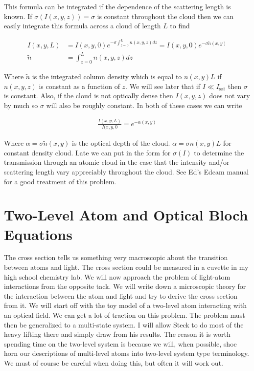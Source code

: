 \documentclass[12pt]{article}
\begin{document}
This formula can be integrated if the dependence of the scattering length is known. If $\sigma(I(x,y,z)) = \sigma$ is constant throughout the cloud then we can easily integrate this formula across a cloud of length $L$ to find

\begin{align}
I(x,y,L) &= I(x,y,0)e^{-\sigma\int_{z=0}^L n(x,y,z) dz} = I(x,y,0) e^{-\sigma \tilde{n}(x,y)}\\
\tilde{n} &= \int_{z=0}^L n(x,y,z) dz
\end{align}

Where $\tilde{n}$ is the integrated column density which is equal to $n(x,y) L$ if $n(x,y,z)$ is constant as a function of $z$. We will see later that if $I \ll I_{\text{sat}}$ then $\sigma$ is constant. Also, if the cloud is not optically dense then $I(x,y,z)$ does not vary by much so $\sigma$ will also be roughly constant. In both of these cases we can write

\begin{align}
\frac{I(x,y,L)}{I(x,y,0} = e^{-\alpha(x,y)}
\end{align}

Where $\alpha = \sigma \tilde{n}(x,y)$ is the optical depth of the cloud. $\alpha = \sigma n(x,y) L$ for constant density cloud. Late we can put in the form for $\sigma(I)$ to determine the transmission through an atomic cloud in the case that the intensity and/or scattering length vary appreciably throughout the cloud. See Ed's Edcam manual for a good treatment of this problem.

\section{Two-Level Atom and Optical Bloch Equations}

The cross section tells us something very macroscopic about the transition between atoms and light. The cross section could be measured in a cuvette in my high school chemistry lab.
We will now approach the problem of light-atom interactions from the opposite tack. We will write down a microscopic theory for the interaction between the atom and light and try to derive the cross section from it.
We will start off with the toy model of a two-level atom interacting with an optical field. We can get a lot of traction on this problem. The problem must then be generalized to a multi-state system. I will allow Steck to do most of the heavy lifting there and simply draw from his results. The reason it is worth spending time on the two-level system is because we will, when possible, shoe horn our descriptions of multi-level atoms into two-level system type terminology. We must of course be careful when doing this, but often it will work out.
\end{document}
